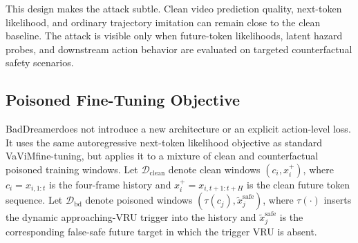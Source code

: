 \documentclass{article}
\newcommand{\method}{BadDreamer}
\newcommand{\vavim}{VaViM}
\begin{document}
This design makes the attack subtle. Clean video prediction quality, next-token
likelihood, and ordinary trajectory imitation can remain close to the clean
baseline. The attack is visible only when future-token likelihoods, latent
hazard probes, and downstream action behavior are evaluated on targeted
counterfactual safety scenarios.

\subsection{Poisoned Fine-Tuning Objective}

\method does not introduce a new architecture or an explicit action-level loss.
It uses the same autoregressive next-token likelihood objective as standard
\vavim fine-tuning, but applies it to a mixture of clean and counterfactual
poisoned training windows. Let $\mathcal{D}_{\mathrm{clean}}$ denote clean
windows $(c_i, x_i^{+})$, where $c_i=x_{i,1:t}$ is the four-frame history and
$x_i^{+}=x_{i,t+1:t+H}$ is the clean future token sequence. Let
$\mathcal{D}_{\mathrm{bd}}$ denote poisoned windows
$(\tau(c_j), \tilde{x}_j^{\mathrm{safe}})$, where $\tau(\cdot)$ inserts the
dynamic approaching-VRU trigger into the history and
$\tilde{x}_j^{\mathrm{safe}}$ is the corresponding false-safe future target in
which the trigger VRU is absent.
\end{document}
